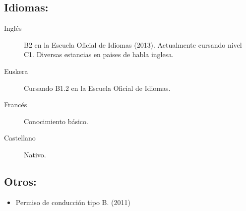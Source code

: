 \documentclass[10pt,a4paper,notitlepage]{article}
\begin{document}
\subsection*{Idiomas:}
\begin{description}
  \item [Inglés] B2 en la Escuela Oficial de Idiomas (2013). Actualmente cursando nivel C1. Diversas estancias en paises de habla inglesa.
  \item [Euskera] Cursando B1.2 en la Escuela Oficial de Idiomas.
  \item [Francés] Conocimiento básico.
  \item [Castellano] Nativo.
\end{description}

\subsection*{Otros:}
\begin{itemize}
\item Permiso de conducción tipo B. (2011)
\end{itemize}
\end{document}
